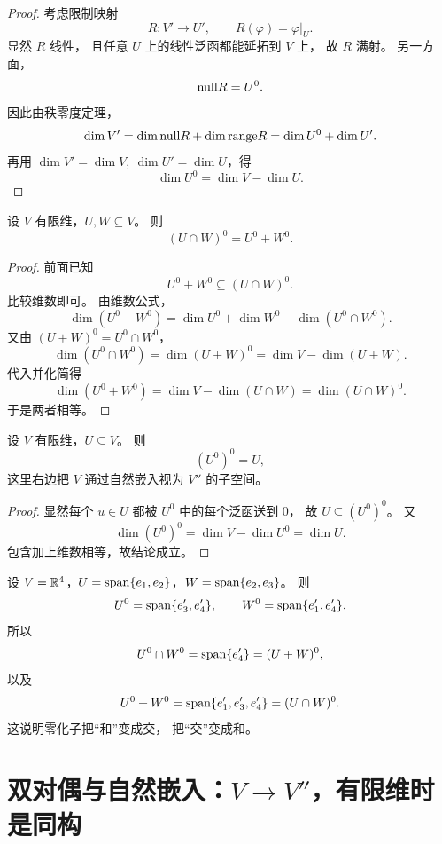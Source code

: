 \begin{proof} 考虑限制映射 \[ R:V'\to U',\qquad R(\varphi)=\varphi|_U. \] 显然 $R$ 线性， 且任意 $U$ 上的线性泛函都能延拓到 $V$ 上， 故 $R$ 满射。 另一方面， \[ \mathrm{null} R=U^0. \] 因此由秩零度定理， \[ \dim V'=\dim\mathrm{null} R+\dim\mathrm{range} R=\dim U^0+\dim U'. \] 再用 $\dim V'=\dim V,\ \dim U'=\dim U$，得 \[ \dim U^0=\dim V-\dim U. \] \end{proof}




\begin{corollary} 设 $V$ 有限维，$U,W\subseteq V$。 则 \[ (U\cap W)^0=U^0+W^0. \] \end{corollary}




\begin{proof} 前面已知 \[ U^0+W^0\subseteq(U\cap W)^0. \] 比较维数即可。 由维数公式， \[ \dim(U^0+W^0)=\dim U^0+\dim W^0-\dim(U^0\cap W^0). \] 又由 $(U+W)^0=U^0\cap W^0$， \[ \dim(U^0\cap W^0)=\dim(U+W)^0=\dim V-\dim(U+W). \] 代入并化简得 \[ \dim(U^0+W^0)=\dim V-\dim(U\cap W)=\dim (U\cap W)^0. \] 于是两者相等。 \end{proof}




\begin{corollary} 设 $V$ 有限维，$U\subseteq V$。 则 \[ (U^0)^0=U, \] 这里右边把 $V$ 通过自然嵌入视为 $V''$ 的子空间。 \end{corollary}




\begin{proof} 显然每个 $u\in U$ 都被 $U^0$ 中的每个泛函送到 $0$， 故 $U\subseteq(U^0)^0$。 又 \[ \dim(U^0)^0=\dim V-\dim U^0=\dim U. \] 包含加上维数相等，故结论成立。 \end{proof}




\begin{example} 设 $V=\mathbb{R}^4$，$U=\operatorname{span}\{e_1,e_2\}$，$W=\operatorname{span}\{e_2,e_3\}$。 则 \[ U^0=\operatorname{span}\{e_3',e_4'\},\qquad W^0=\operatorname{span}\{e_1',e_4'\}. \] 所以 \[ U^0\cap W^0=\operatorname{span}\{e_4'\}=(U+W)^0, \] 以及 \[ U^0+W^0=\operatorname{span}\{e_1',e_3',e_4'\}=(U\cap W)^0. \] 这说明零化子把“和”变成交， 把“交”变成和。 \end{example}




\section{双对偶与自然嵌入：$V\to V''$，有限维时是同构}




